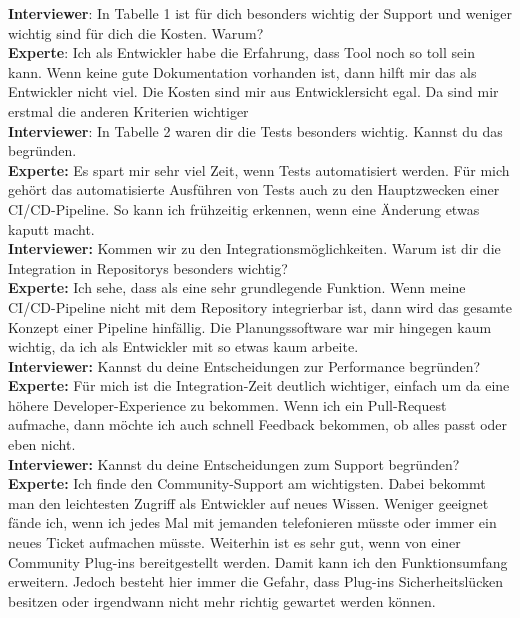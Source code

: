 \begin{center}
    \begin{figure}[H]
        \centering
        \label{fig:CEA}
    \end{figure}	
\end{center}
\newpage

\resetlinenumber
\begin{linenumbers}
    \textbf{Interviewer}: In Tabelle 1 ist für dich besonders wichtig der Support und weniger wichtig sind für dich die Kosten. Warum?\\
    \textbf{Experte}: Ich als Entwickler habe die Erfahrung, dass Tool noch so toll sein kann. Wenn keine gute Dokumentation vorhanden ist, dann hilft mir das als Entwickler nicht viel. Die Kosten sind mir aus Entwicklersicht egal. Da sind mir erstmal die anderen Kriterien wichtiger\\
    \textbf{Interviewer}: In Tabelle 2 waren dir die Tests besonders wichtig. Kannst du das begründen.\\
    \textbf{Experte:} Es spart mir sehr viel Zeit, wenn Tests automatisiert werden. Für mich gehört das automatisierte Ausführen von Tests auch zu den Hauptzwecken einer CI/CD-Pipeline. So kann ich frühzeitig erkennen, wenn eine Änderung etwas kaputt macht.\\
    \textbf{Interviewer:} Kommen wir zu den Integrationsmöglichkeiten. Warum ist dir die Integration in Repositorys besonders wichtig?\\
    \textbf{Experte:} Ich sehe, dass als eine sehr grundlegende Funktion. Wenn meine CI/CD-Pipeline nicht mit dem Repository integrierbar ist, dann wird das gesamte Konzept einer Pipeline hinfällig. Die Planungssoftware war mir hingegen kaum wichtig, da ich als Entwickler mit so etwas kaum arbeite.\\
    \textbf{Interviewer:} Kannst du deine Entscheidungen zur Performance begründen?\\
    \textbf{Experte:} Für mich ist die Integration-Zeit deutlich wichtiger, einfach um da eine höhere Developer-Experience zu bekommen. Wenn ich ein Pull-Request aufmache, dann möchte ich auch schnell Feedback bekommen, ob alles passt oder eben nicht.\\
    \textbf{Interviewer:} Kannst du deine Entscheidungen zum Support begründen?\\
    \textbf{Experte:} Ich finde den Community-Support am wichtigsten. Dabei bekommt man den leichtesten Zugriff als Entwickler auf neues Wissen. Weniger geeignet fände ich, wenn ich jedes Mal mit jemanden telefonieren müsste oder immer ein neues Ticket aufmachen müsste. Weiterhin ist es sehr gut, wenn von einer Community Plug-ins bereitgestellt werden. Damit kann ich den Funktionsumfang erweitern. Jedoch besteht hier immer die Gefahr, dass Plug-ins Sicherheitslücken besitzen oder irgendwann nicht mehr richtig gewartet werden können.\\

\end{linenumbers}
